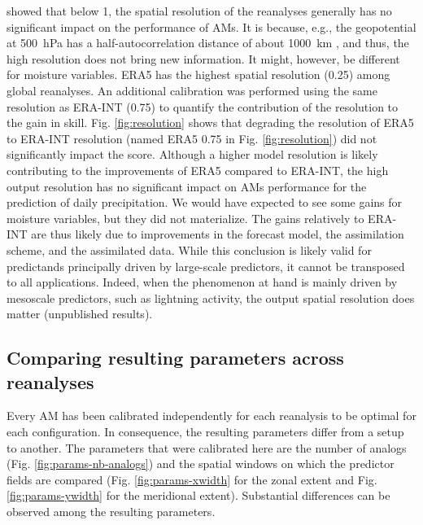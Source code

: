 \documentclass[alpha-refs]{wiley-article}
\begin{document}
\citet{Horton2018b} showed that below 1\degree, the spatial resolution of the reanalyses generally has no significant impact on the performance of AMs. It is because, e.g., the geopotential at 500~hPa has a half-autocorrelation distance of about 1000~km \citep{Thiebaux1985}, and thus, the high resolution does not bring new information. It might, however, be different for moisture variables. ERA5 has the highest spatial resolution (0.25\degree) among global reanalyses. An additional calibration was performed using the same resolution as ERA-INT (0.75\degree) to quantify the contribution of the resolution to the gain in skill. Fig. \ref{fig:resolution} shows that degrading the resolution of ERA5 to ERA-INT resolution (named ERA5 0.75 in Fig. \ref{fig:resolution}) did not significantly impact the score. Although a higher model resolution is likely contributing to the improvements of ERA5 compared to ERA-INT, the high output resolution has no significant impact on AMs performance for the prediction of daily precipitation. We would have expected to see some gains for moisture variables, but they did not materialize. The gains relatively to ERA-INT are thus likely due to improvements in the forecast model, the assimilation scheme, and the assimilated data. While this conclusion is likely valid for predictands principally driven by large-scale predictors, it cannot be transposed to all applications. Indeed, when the phenomenon at hand is mainly driven by mesoscale predictors, such as lightning activity, the output spatial resolution does matter (unpublished results).


\subsection{Comparing resulting parameters across reanalyses}
\label{sec:results_parameters}

Every AM has been calibrated independently for each reanalysis to be optimal for each configuration. In consequence, the resulting parameters differ from a setup to another. The parameters that were calibrated here are the number of analogs (Fig. \ref{fig:params-nb-analogs}) and the spatial windows on which the predictor fields are compared (Fig. \ref{fig:params-xwidth} for the zonal extent and Fig. \ref{fig:params-ywidth} for the meridional extent). Substantial differences can be observed among the resulting parameters.
\end{document}
